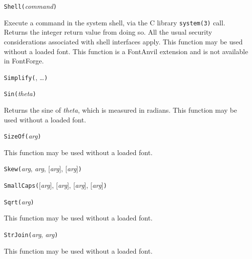 

\texttt{Shell(}\textit{command}\texttt{)}

Execute a command in the system shell, via the C library \texttt{system(3)}
call.  Returns the integer return value from doing so.  All the usual
security considerations associated with shell interfaces apply.
This function may be used without a loaded font.  This \FFdiff function is a
FontAnvil extension and is not available in FontForge.



\texttt{Simplify(}, \ldots\texttt{)}



\texttt{Sin(}\textit{theta}\texttt{)}

Returns the sine of \textit{theta}, which is measured in radians.
This function may be used without a loaded font.



\texttt{SizeOf(}\textit{arg}\texttt{)}

This function may be used without a loaded font.



\texttt{Skew(}\textit{arg}, \textit{arg}, [\textit{arg}], [\textit{arg}]\texttt{)}



\texttt{SmallCaps(}[\textit{arg}], [\textit{arg}], [\textit{arg}], [\textit{arg}]\texttt{)}



\texttt{Sqrt(}\textit{arg}\texttt{)}

This function may be used without a loaded font.



\texttt{StrJoin(}\textit{arg}, \textit{arg}\texttt{)}

This function may be used without a loaded font.

